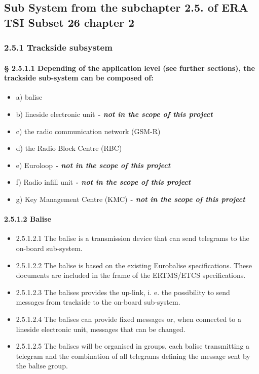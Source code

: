 \subsection{Sub System from the subchapter 2.5. of ERA TSI Subset 26 chapter 2}
\subsubsection{2.5.1 Trackside subsystem}
\paragraph{§ 2.5.1.1	Depending of the application level (see further sections), the trackside sub-system can be composed of:}
\begin{itemize}
\item a) balise
\item b) lineside electronic unit \textbf{\textit{- not in the scope of this project}}
\item c) the radio communication network (GSM-R)
\item d) the Radio Block Centre (RBC)
\item e) Euroloop \textbf{\textit{- not in the scope of this project}}
\item f) Radio infill unit \textbf{\textit{- not in the scope of this project}}
\item g) Key Management Centre (KMC) \textbf{\textit{- not in the scope of this project}}
\end{itemize}


\paragraph{2.5.1.2 Balise}
\begin{itemize}
\item 2.5.1.2.1	The balise is a transmission device that can send telegrams to the on-board sub-system.
\item 2.5.1.2.2	The balise is based on the existing Eurobalise specifications. These documents are included in the frame of the ERTMS/ETCS specifications.
\item 2.5.1.2.3	The balises provides the up-link, i. e. the possibility to send messages from trackside to the on-board sub-system.
\item 2.5.1.2.4	The balises can provide fixed messages or, when connected to a lineside electronic unit, messages that can be changed. 
\item 2.5.1.2.5	The balises will be organised in groups, each balise transmitting a telegram and the combination of all telegrams defining the message sent by the balise group.
\end{itemize}

